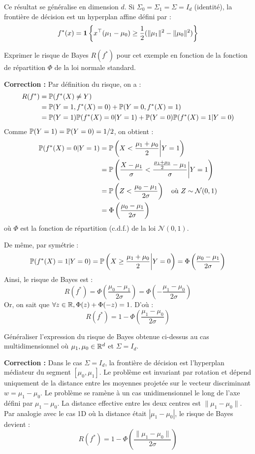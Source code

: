 \begin{remarque}[Généralisation à $\R^d$]
Ce résultat se généralise en dimension $d$. Si $\Sigma_0 = \Sigma_1 = \Sigma = I_d$ (identité), la frontière de décision est un hyperplan affine défini par :
\[
f^*(x) = \mathbf{1}\left\{ x^\top (\mu_1 - \mu_0) \ge \frac{1}{2} (\|\mu_1\|^2 - \|\mu_0\|^2) \right\}
\]
\end{remarque}

\begin{exercice}
Exprimer le risque de Bayes $R(f^*)$ pour cet exemple en fonction de la fonction de répartition $\Phi$ de la loi normale standard.

\textbf{Correction :}
Par définition du risque, on a :
\begin{align*}
R(f^*) &= \mathbb{P}(f^*(X) \neq Y) \\
&= \mathbb{P}(Y=1, f^*(X)=0) + \mathbb{P}(Y=0, f^*(X)=1) \\
&= \mathbb{P}(Y=1) \mathbb{P}(f^*(X)=0 | Y=1) + \mathbb{P}(Y=0) \mathbb{P}(f^*(X)=1 | Y=0)
\end{align*}
Comme $\mathbb{P}(Y=1) = \mathbb{P}(Y=0) = 1/2$, on obtient :
\begin{align*}
\mathbb{P}(f^*(X)=0 | Y=1) &= \mathbb{P}\left( X < \frac{\mu_1+\mu_0}{2} \bigg| Y=1 \right) \\
&= \mathbb{P}\left( \frac{X-\mu_1}{\sigma} < \frac{\frac{\mu_1+\mu_0}{2} - \mu_1}{\sigma} \bigg| Y=1 \right) \\
&= \mathbb{P}\left( Z < \frac{\mu_0-\mu_1}{2\sigma} \right) \quad \text{où } Z \sim \mathcal{N}(0,1) \\
&= \Phi\left( \frac{\mu_0-\mu_1}{2\sigma} \right)
\end{align*}
où $\Phi$ est la fonction de répartition (c.d.f.) de la loi $\mathcal{N}(0,1)$.

De même, par symétrie :
\[
\mathbb{P}(f^*(X)=1 | Y=0) = \mathbb{P}\left( X \ge \frac{\mu_1+\mu_0}{2} \bigg| Y=0 \right) = \Phi\left( \frac{\mu_0-\mu_1}{2\sigma} \right)
\]
Ainsi, le risque de Bayes est :
\[
R(f^*) = \Phi\left( \frac{\mu_0-\mu_1}{2\sigma} \right) = \Phi\left( - \frac{\mu_1-\mu_0}{2\sigma} \right)
\]
Or, on sait que $\forall z \in \mathbb{R}, \Phi(z) + \Phi(-z) = 1$. D'où :
\[
R(f^*) = 1 - \Phi\left( \frac{\mu_1-\mu_0}{2\sigma} \right)
\]
\end{exercice}

\begin{exercice}[Généralisation à $\R^d$]
Généraliser l'expression du risque de Bayes obtenue ci-dessus au cas multidimensionnel où $\mu_1, \mu_0 \in \mathbb{R}^d$ et $\Sigma = I_d$.

\textbf{Correction :}
Dans le cas $\Sigma = I_d$, la frontière de décision est l'hyperplan médiateur du segment $[\mu_0, \mu_1]$. Le problème est invariant par rotation et dépend uniquement de la distance entre les moyennes projetée sur le vecteur discriminant $w = \mu_1 - \mu_0$.
Le problème se ramène à un cas unidimensionnel le long de l'axe défini par $\mu_1 - \mu_0$. La distance effective entre les deux centres est $\|\mu_1 - \mu_0\|$.
Par analogie avec le cas 1D où la distance était $|\mu_1 - \mu_0|$, le risque de Bayes devient :
\[
R(f^*) = 1 - \Phi\left( \frac{\|\mu_1-\mu_0\|}{2\sigma} \right)
\]
\end{exercice}

